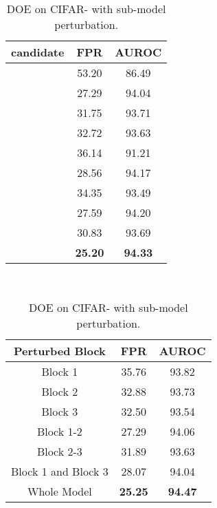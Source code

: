 \documentclass{article} \usepackage{iclr2022_conference,times}
\begin{document}
\begin{table}[t]
\centering
\parbox{.5\linewidth}{
\centering
\scriptsize
\caption{DOE on CIFAR- with various .} \label{tab: hyper_alpha}
\vspace{5pt}
{
\begin{tabular}{c|cc}
\toprule[1.5pt]
 candidate                      & FPR                & AUROC                  \\
\midrule[0.6pt]
                           & 53.20                  & 86.49                  \\
                           & 27.29                  & 94.04                  \\
                           & 31.75                  & 93.71                  \\
                           & 32.72                  & 93.63                 \\
                   & 36.14                  & 91.21                  \\
                   & 28.56                  & 94.17                  \\
                   & 34.35                  & 93.49                  \\
           & 27.59                  & 94.20                  \\
           & 30.83                  & 93.69                  \\
\cellcolor{greyL}   & \cellcolor{greyL}\textbf{25.20}                  & \cellcolor{greyL}\textbf{94.33}                  \\
\bottomrule[1.5pt]      
\end{tabular}
}}~~~~~~~~~~~~~~~
\centering
\parbox{.5\linewidth}{
\centering
\scriptsize
\caption{DOE on CIFAR- with sub-model perturbation.} \label{tab: hyper_subp}
\vspace{5pt}
{
\begin{tabular}{c|cc}
\toprule[1.5pt]
Perturbed Block                          & FPR                & AUROC                  \\
\midrule[0.6pt]
Block 1                                  & 35.76                  & 93.82                  \\
Block 2                                  & 32.88                  & 93.73                  \\
Block 3                                  & 32.50                  & 93.54                  \\
Block 1-2                       & 27.29                  & 94.06                  \\
Block 2-3                       & 31.89                  & 93.63                  \\
Block 1 and Block 3                      & 28.07                  & 94.04                  \\
\cellcolor{greyL}Whole Model                       & \cellcolor{greyL}\textbf{25.25}                  & \cellcolor{greyL}\textbf{94.47}                  \\
\bottomrule[1.5pt]      
\end{tabular}
}}
\end{table}
\end{document}
